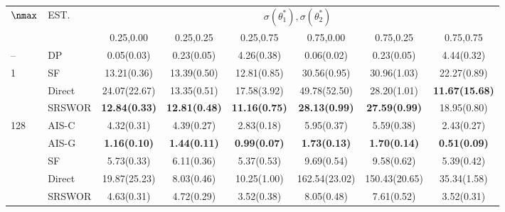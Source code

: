 \begin{tabular}{llcccccc}
  \toprule
  \multirow{2}{*}{$\nmax$} & \multirow{2}{*}{EST.} & \multicolumn{6}{c}{$\sigma(\theta^*_1),\sigma(\theta^*_2)$} \\
  \cmidrule{3-8}
                         &                       & 0.25,0.00             & 0.25,0.25             & 0.25,0.75             & 0.75,0.00             & 0.75,0.25             & 0.75,0.75             \\
  \midrule
  \multirow{1}{*}{--}    & DP                    & {0.05(0.03)}          & {0.23(0.05)}          & {4.26(0.38)}          & {0.06(0.02)}          & {0.23(0.05)}          & {4.44(0.32)}          \\
  \midrule
  \multirow{3}{*}{1}     & SF                    & {13.21(0.36)}         & {13.39(0.50)}         & {12.81(0.85)}         & {30.56(0.95)}         & {30.96(1.03)}         & {22.27(0.89)}         \\
                         & Direct                & {24.07(22.67)}        & {13.35(0.51)}         & {17.58(3.92)}         & {49.78(52.50)}        & {28.20(1.01)}         & \textbf{11.67(15.68)} \\
                         & SRSWOR                & \textbf{12.84(0.33)}  & \textbf{12.81(0.48)}  & \textbf{11.16(0.75)}  & \textbf{28.13(0.99)}  & \textbf{27.59(0.99)}  & {18.95(0.80)}         \\
  \midrule
  \multirow{5}{*}{128}   & AIS-C                 & {4.32(0.31)}          & {4.39(0.27)}          & {2.83(0.18)}          & {5.95(0.37)}          & {5.59(0.38)}          & {2.43(0.27)}          \\
                         & AIS-G                 & \textbf{1.16(0.10)}   & \textbf{1.44(0.11)}   & \textbf{0.99(0.07)}   & \textbf{1.73(0.13)}   & \textbf{1.70(0.14)}   & \textbf{0.51(0.09)}   \\
                         & SF                    & {5.73(0.33)}          & {6.11(0.36)}          & {5.37(0.53)}          & {9.69(0.54)}          & {9.58(0.62)}          & {5.39(0.42)}          \\
                         & Direct                & {19.87(25.23)}        & {8.03(0.46)}          & {10.25(1.00)}         & {162.54(23.02)}       & {150.43(20.65)}       & {35.34(1.58)}         \\
                         & SRSWOR                & {4.63(0.31)}          & {4.72(0.29)}          & {3.52(0.38)}          & {8.05(0.48)}          & {7.61(0.52)}          & {3.52(0.31)}          \\

\end{tabular}
